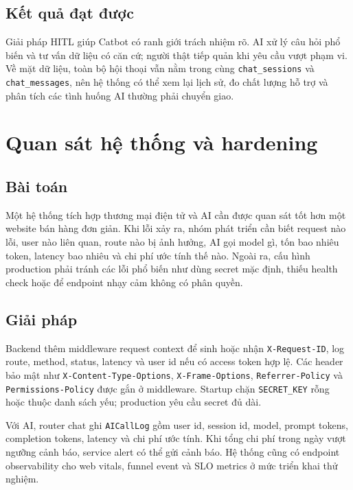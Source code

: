\documentclass[../DoAn.tex]{subfiles}
\begin{document}
\subsection{Kết quả đạt được}
\label{subsection:5.4.3}

Giải pháp HITL giúp Catbot có ranh giới trách nhiệm rõ. AI xử lý câu hỏi phổ biến và tư vấn dữ liệu có căn cứ; người thật tiếp quản khi yêu cầu vượt phạm vi. Về mặt dữ liệu, toàn bộ hội thoại vẫn nằm trong cùng \texttt{chat\_sessions} và \texttt{chat\_messages}, nên hệ thống có thể xem lại lịch sử, đo chất lượng hỗ trợ và phân tích các tình huống AI thường phải chuyển giao.

\section{Quan sát hệ thống và hardening}
\label{section:5.5}

\subsection{Bài toán}
\label{subsection:5.5.1}

Một hệ thống tích hợp thương mại điện tử và AI cần được quan sát tốt hơn một website bán hàng đơn giản. Khi lỗi xảy ra, nhóm phát triển cần biết request nào lỗi, user nào liên quan, route nào bị ảnh hưởng, AI gọi model gì, tốn bao nhiêu token, latency bao nhiêu và chi phí ước tính thế nào. Ngoài ra, cấu hình production phải tránh các lỗi phổ biến như dùng secret mặc định, thiếu health check hoặc để endpoint nhạy cảm không có phân quyền.

\subsection{Giải pháp}
\label{subsection:5.5.2}

Backend thêm middleware request context để sinh hoặc nhận \texttt{X-Request-ID}, log route, method, status, latency và user id nếu có access token hợp lệ. Các header bảo mật như \texttt{X-Content-Type-Options}, \texttt{X-Frame-Options}, \texttt{Referrer-Policy} và \texttt{Permissions-Policy} được gắn ở middleware. Startup chặn \texttt{SECRET\_KEY} rỗng hoặc thuộc danh sách yếu; production yêu cầu secret đủ dài.

Với AI, router chat ghi \texttt{AICallLog} gồm user id, session id, model, prompt tokens, completion tokens, latency và chi phí ước tính. Khi tổng chi phí trong ngày vượt ngưỡng cảnh báo, service alert có thể gửi cảnh báo. Hệ thống cũng có endpoint observability cho web vitals, funnel event và SLO metrics ở mức triển khai thử nghiệm.
\end{document}
